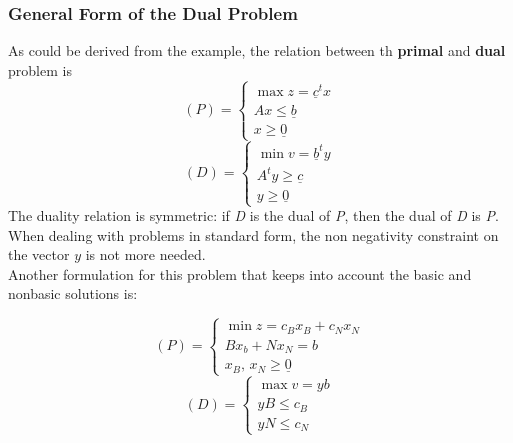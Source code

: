         \subsubsection{General Form of the Dual Problem}
            As could be derived from the example, the relation between th \textbf{primal} and \textbf{dual} problem is
            \begin{equation}
                (P) = 
                \begin{cases}
                    \max z = \underline{c}^tx \\
                    Ax \leq \underline{b} \\
                    x \geq \underline{0}
                \end{cases}
            \end{equation}
            \begin{equation}
                (D) = 
                \begin{cases}
                    \min v = \underline{b}^ty \\
                    A^ty \geq \underline{c} \\
                    y \geq \underline{0}
                \end{cases}
            \end{equation}
            The duality relation is symmetric: if \emph{D} is the dual of \emph{P}, then the dual of \emph{D} is \emph{P}.\\
            When dealing with problems in standard form, the non negativity constraint on the vector $y$ is not more needed.\\
            Another formulation for this problem that keeps into account the basic and nonbasic solutions is:
            \begin{multicols}{2}
                \begin{equation}
                    (P) = 
                    \begin{cases}
                        \min z = c_Bx_B + c_Nx_N \\
                        Bx_b + Nx_N = b \\
                        x_B,\, x_N \geq \underline{0}
                    \end{cases}
                \end{equation}
                \break
                \begin{equation}
                    (D) = 
                    \begin{cases}
                        \max v = yb \\
                        yB \leq c_B \\
                        yN \leq c_N
                    \end{cases}
                \end{equation}
            \end{multicols}

